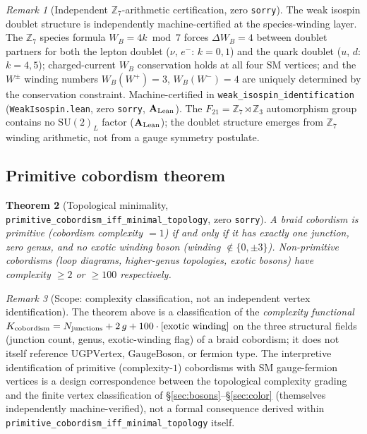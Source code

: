 \documentclass[12pt]{article}
\newtheorem{theorem}{Theorem}[section]
\theoremstyle{remark}
\newtheorem{remark}[theorem]{Remark}
\newcommand{\sorry}{\texttt{sorry}}
\newcommand{\lean}[1]{\texttt{#1}}
\newcommand{\CatAL}{\ensuremath{\textbf{A}_{\rm Lean}}}
\begin{document}
\begin{remark}[Independent $\mathbb{Z}_7$-arithmetic certification, zero \sorry]
The weak isospin doublet structure is independently machine-certified at the
species-winding layer.  The $\mathbb{Z}_7$ species formula $W_B = 4k \bmod 7$
forces $\Delta W_B = 4$ between doublet partners for both the lepton doublet
($\nu$, $e^-$: $k=0,1$) and the quark doublet ($u$, $d$: $k=4,5$);
charged-current $W_B$ conservation holds at all four SM vertices; and the
$W^\pm$ winding numbers $W_B(W^+) = 3$, $W_B(W^-) = 4$ are uniquely determined
by the conservation constraint.  Machine-certified in
\lean{weak\_isospin\_identification} (\texttt{WeakIsospin.lean},
zero \sorry, $\CatAL$).
The $F_{21} = \mathbb{Z}_7 \rtimes \mathbb{Z}_3$ automorphism group contains no
$\mathrm{SU}(2)_L$ factor ($\CatAL$); the doublet structure emerges from
$\mathbb{Z}_7$ winding arithmetic, not from a gauge symmetry postulate.
\end{remark}

\subsection{Primitive cobordism theorem}

\begin{theorem}[Topological minimality, \lean{primitive\_cobordism\_iff\_minimal\_topology},
zero \sorry]
A braid cobordism is \emph{primitive} (cobordism complexity $= 1$) if and only
if it has exactly one junction, zero genus, and no exotic winding boson
(winding $\notin \{0, \pm 3\}$).  Non-primitive cobordisms (loop diagrams,
higher-genus topologies, exotic bosons) have complexity $\geq 2$ or $\geq 100$
respectively.
\end{theorem}

\begin{remark}[Scope: complexity classification, not an independent vertex identification]
The theorem above is a classification of the \emph{complexity functional}
$K_{\rm cobordism} = N_{\rm junctions} + 2\,g + 100\cdot[\text{exotic winding}]$
on the three structural fields (junction count, genus, exotic-winding flag) of
a braid cobordism; it does not itself reference $\mathrm{UGPVertex}$,
$\mathrm{GaugeBoson}$, or fermion type.  The interpretive identification of
primitive (complexity-$1$) cobordisms with SM gauge-fermion vertices is a
design correspondence between the topological complexity grading and the
finite vertex classification of \S\ref{sec:bosons}--\S\ref{sec:color}
(themselves independently machine-verified), not a formal consequence derived
within \lean{primitive\_cobordism\_iff\_minimal\_topology} itself.
\end{remark}
\end{document}
